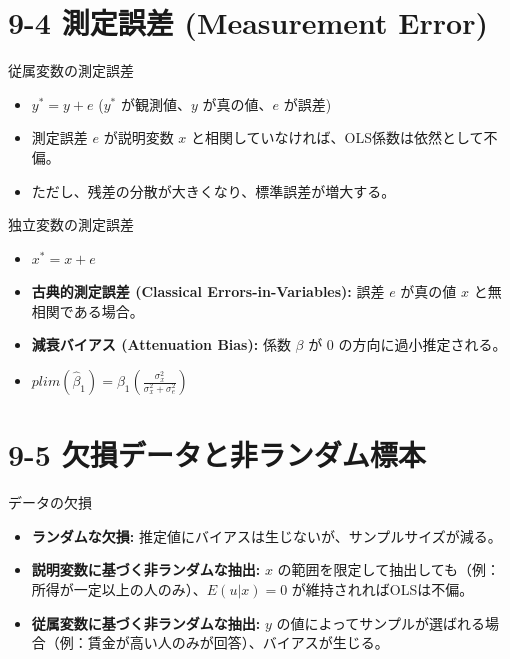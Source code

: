 \documentclass[
  ignorenonframetext,
]{beamer}
\providecommand{\tightlist}{%
  \setlength{\itemsep}{0pt}\setlength{\parskip}{0pt}}
\begin{document}
\section{9-4 測定誤差 (Measurement
Error)}\label{ux6e2cux5b9aux8aa4ux5dee-measurement-error}

\begin{frame}{従属変数の測定誤差}
\label{ux5f93ux5c5eux5909ux6570ux306eux6e2cux5b9aux8aa4ux5dee}
\begin{itemize}
\tightlist
\item
  \(y^* = y + e\) (\(y^*\) が観測値、\(y\) が真の値、\(e\) が誤差)
\item
  測定誤差 \(e\) が説明変数 \(x\)
  と相関していなければ、OLS係数は依然として不偏。
\item
  ただし、残差の分散が大きくなり、標準誤差が増大する。
\end{itemize}
\end{frame}

\begin{frame}{独立変数の測定誤差}
\label{ux72ecux7acbux5909ux6570ux306eux6e2cux5b9aux8aa4ux5dee}
\begin{itemize}
\tightlist
\item
  \(x^* = x + e\)
\item
  \textbf{古典的測定誤差 (Classical Errors-in-Variables):} 誤差 \(e\)
  が真の値 \(x\) と無相関である場合。
\item
  \textbf{減衰バイアス (Attenuation Bias):} 係数 \(\beta\) が 0
  の方向に過小推定される。
\item
  \(plim(\hat{\beta}_1) = \beta_1 \left( \frac{\sigma^2_x}{\sigma^2_x + \sigma^2_e} \right)\)
\end{itemize}
\end{frame}

\section{9-5
欠損データと非ランダム標本}\label{ux6b20ux640dux30c7ux30fcux30bfux3068ux975eux30e9ux30f3ux30c0ux30e0ux6a19ux672c}

\begin{frame}{データの欠損}
\label{ux30c7ux30fcux30bfux306eux6b20ux640d}
\begin{itemize}
\tightlist
\item
  \textbf{ランダムな欠損:}
  推定値にバイアスは生じないが、サンプルサイズが減る。
\item
  \textbf{説明変数に基づく非ランダムな抽出:} \(x\)
  の範囲を限定して抽出しても（例：所得が一定以上の人のみ）、\(E(u|x)=0\)
  が維持されればOLSは不偏。
\item
  \textbf{従属変数に基づく非ランダムな抽出:} \(y\)
  の値によってサンプルが選ばれる場合（例：賃金が高い人のみが回答）、バイアスが生じる。
\end{itemize}
\end{frame}
\end{document}
